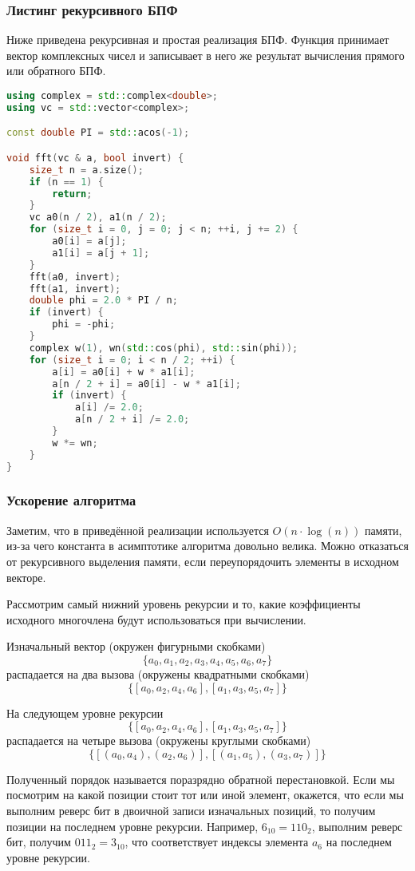 \subsubsection*{Листинг рекурсивного БПФ}
Ниже приведена рекурсивная и простая реализация БПФ. Функция принимает вектор комплексных чисел и записывает в него же результат вычисления прямого или обратного БПФ.
\begin{lstlisting}[language=C++]
using complex = std::complex<double>;
using vc = std::vector<complex>;

const double PI = std::acos(-1);

void fft(vc & a, bool invert) {
    size_t n = a.size();
    if (n == 1) {
        return;
    }
    vc a0(n / 2), a1(n / 2);
    for (size_t i = 0, j = 0; j < n; ++i, j += 2) {
        a0[i] = a[j];
        a1[i] = a[j + 1];
    }
    fft(a0, invert);
    fft(a1, invert);
    double phi = 2.0 * PI / n;
    if (invert) {
        phi = -phi;
    }
    complex w(1), wn(std::cos(phi), std::sin(phi));
    for (size_t i = 0; i < n / 2; ++i) {
        a[i] = a0[i] + w * a1[i];
        a[n / 2 + i] = a0[i] - w * a1[i];
        if (invert) {
            a[i] /= 2.0;
            a[n / 2 + i] /= 2.0;
        }
        w *= wn;
    }
}
\end{lstlisting}

\pagebreak

\subsubsection*{Ускорение алгоритма}
Заметим, что в приведённой реализации используется $O(n \cdot \log(n))$ памяти, из-за чего константа в асимптотике алгоритма довольно велика. Можно отказаться от рекурсивного выделения памяти, если переупорядочить элементы в исходном векторе.

Рассмотрим самый нижний уровень рекурсии и то, какие коэффициенты исходного многочлена будут использоваться при вычислении.

Изначальный вектор (окружен фигурными скобками)
$$ \{ a_0, a_1, a_2, a_3, a_4, a_5, a_6, a_7 \} $$
распадается на два вызова (окружены квадратными скобками)
$$\{ [ a_0, a_2, a_4, a_6 ], [ a_1, a_3, a_5, a_7 ] \}$$

На следующем уровне рекурсии
$$\{ [ a_0, a_2, a_4, a_6 ], [ a_1, a_3, a_5, a_7 ] \}$$
распадается на четыре вызова (окружены круглыми скобками)
$$\{ [ (a_0, a_4), (a_2, a_6) ], [(a_1, a_5), (a_3, a_7)] \}$$

Полученный порядок называется поразрядно обратной перестановкой. Если мы посмотрим на какой позиции стоит тот или иной элемент, окажется, что если мы выполним реверс бит в двоичной записи изначальных позиций, то получим позиции на последнем уровне рекурсии. Например, $6_{10} = {110}_{2}$, выполним реверс бит, получим ${011}_{2} = {3}_{10}$, что соответствует индексы элемента $a_6$ на последнем уровне рекурсии.

